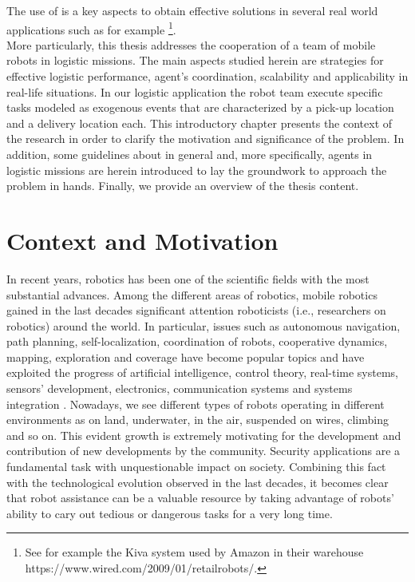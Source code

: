 The use of \mrs is a key aspects to obtain effective solutions in several real world
applications such as for example \footnote{See for example the Kiva system used by Amazon in their warehouse https://www.wired.com/2009/01/retailrobots/.}.
\\
More particularly,
this thesis addresses the cooperation of a team of mobile robots in logistic missions.
The main aspects studied herein are strategies for effective logistic performance,
agent's coordination, scalability and applicability in real-life situations.
In our logistic application the robot team execute specific tasks modeled as exogenous events 
that are characterized by a pick-up location and a delivery location each.
\newline
This introductory chapter presents the context of the research in order to clarify
the motivation and significance of the problem. 
In addition, some guidelines about \mrs in general and, more specifically,
agents in logistic missions are herein introduced to lay the groundwork to 
approach the problem in hands. 
Finally, we provide an overview of the thesis content. 

\section{Context and Motivation}
In recent years, robotics has been one of the scientific fields with the most substantial
advances. Among the different areas of robotics, mobile robotics gained in the last decades 
significant attention roboticists (i.e., researchers on robotics)
around the world. In particular, issues such as autonomous navigation, path planning,
self-localization, coordination of robots, cooperative dynamics, mapping, exploration 
and coverage have become popular topics and have exploited the progress
of artificial intelligence, control theory, real-time systems, sensors’ development,
electronics, communication systems and systems integration \cite{parker}.
\newline
Nowadays, we see different types of robots operating in
different environments as on land, underwater, in the air, suspended on wires,
climbing and so on. This evident growth is extremely motivating for the development
 and contribution of new developments by the community.
\newline
Security applications are a fundamental task with unquestionable impact on
society. Combining this fact with the technological evolution observed in the last
decades, it becomes clear that robot assistance can be a valuable resource by
taking advantage of robots’ ability to cary out tedious or dangerous tasks for a very long time.


